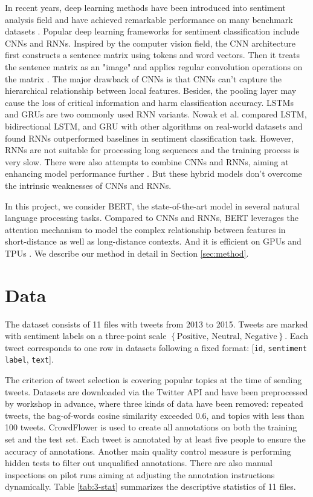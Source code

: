 \documentclass[runningheads]{llncs}
\begin{document}
In recent years, deep learning methods have been introduced into sentiment analysis field and have achieved remarkable performance on many benchmark datasets \cite{2019sa}. Popular deep learning frameworks for sentiment classification include CNNs and RNNs. Inspired by the computer vision field, the CNN architecture first constructs a sentence matrix using tokens and word vectors. Then it treats the sentence matrix as an "image" and applies regular convolution operations on the matrix \cite{cnns}. The major drawback of CNNs is that CNNs can't capture the hierarchical relationship between local features. Besides, the pooling layer may cause the loss of critical information and harm classification accuracy. LSTMs and GRUs are two commonly used RNN variants. Nowak et al. \cite{rnns} compared LSTM, bidirectional LSTM, and GRU with other algorithms on real-world datasets and found RNNs outperformed baselines in sentiment classification task. However, RNNs are not suitable for processing long sequences and the training process is very slow. There were also attempts to combine CNNs and RNNs, aiming at enhancing model performance further \cite{com1}\cite{com2}. But these hybrid models don't overcome the intrinsic weaknesses of CNNs and RNNs.

In this project, we consider BERT, the state-of-the-art model in several natural language processing tasks. Compared to CNNs and RNNs, BERT leverages the attention mechanism to model the complex relationship between features in short-distance as well as long-distance contexts. And it is efficient on GPUs and TPUs \cite{bert}. We describe our method in detail in Section \ref{sec:method}.

\section{Data}
The dataset consists of 11 files with tweets from 2013 to 2015. Tweets are marked with sentiment labels on a three-point scale $\left\{ \text{Positive, Neutral, Negative} \right\}$. Each tweet corresponds to one row in datasets following a fixed format: [\texttt{id}, \texttt{sentiment label}, \texttt{text}].

The criterion of tweet selection is covering popular topics at the time of sending tweets. Datasets are downloaded via the Twitter API and have been preprocessed by workshop in advance, where three kinds of data have been removed: repeated tweets, the bag-of-words cosine similarity exceeded 0.6, and topics with less than 100 tweets. CrowdFlower is used to create all annotations on both the training set and the test set. Each tweet is annotated by at least five people to ensure the accuracy of annotations. Another main quality control measure is performing hidden tests to filter out unqualified annotations. There are also manual inspections on pilot runs aiming at adjusting the annotation instructions dynamically. Table \ref{tab:3-stat} summarizes the descriptive statistics of 11 files.
\end{document}
